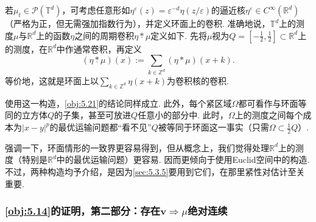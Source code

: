 \begin{remark}\label{obj:5.22}
若$\mu_t\in\mathscr P(\mathbb T^d)$，可考虑任意形如$\eta^\varepsilon(z)=\varepsilon^{-d}\eta(z/\varepsilon)$的逼近核$\eta^\varepsilon\in C^\infty(\mathbb R^d)$（严格为正，但无需强加指数行为），并定义环面上的卷积. 准确地说，$\mathbb T^d$上的测度$\mu$与$\mathbb R^d$上的函数$\eta$之间的周期卷积$\eta\mathbin{\underline *}\mu$定义如下. 先将$\mu$视为$Q=[-\frac12,\frac12]\subset\mathbb R^d$上的测度，在$\mathbb R^d$中作通常卷积，再定义
\[
(\eta\mathbin{\underline *}\mu)(x):=\sum_{k\in\mathbb Z^d}(\eta*\mu)(x+k).
\]
等价地，这就是环面上以$\sum_{k\in\mathbb Z^d}\eta(x+k)$为卷积核的卷积.

使用这一构造，\autoref{obj:5.21}的结论同样成立. 此外，每个紧区域$\Omega$都可看作与环面等同的立方体$Q$的子集，甚至可放进$Q$任意小的部分中. 此时，$\Omega$上的测度之间每个成本为$|x-y|^p$的最优运输问题都“看不见”$Q$被等同于环面这一事实（只需$\Omega\subset\frac12Q$）.
\end{remark}

强调一下，环面情形的一致界更容易得到，但从概念上，我们觉得处理$\mathbb R^d$上的测度（特别是$\mathbb R^d$中的最优运输问题）更容易. 因而更倾向于使用Euclid空间中的构造. 不过，两种构造均予介绍，是因为\autoref{sec:5.3.5}要用到它们，在那里紧性对估计至关重要.

\subsubsection[主要定理的证明，第二部分：由速度场得到绝对连续性]{\autoref{obj:5.14}的证明，第二部分：存在$\mathbf v\Rightarrow\mu$绝对连续}\label{sec:5.3.4}

